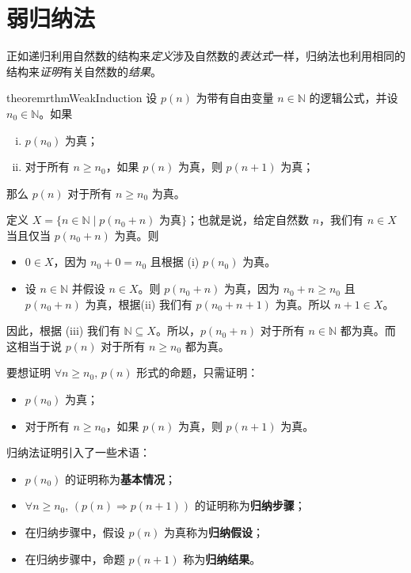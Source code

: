 \section{弱归纳法}

正如递归利用自然数的结构来\textit{定义}涉及自然数的\textit{表达式}一样，归纳法也利用相同的结构来\textit{证明}有关自然数的\textit{结果}。

\begin{restatable}[弱归纳原理]{theorem}{rthmWeakInduction}
\label{thmWeakInduction}
设 $p(n)$ 为带有自由变量 $n \in \mathbb{N}$ 的逻辑公式，并设 $n_0 \in \mathbb{N}$。如果
\begin{enumerate}[(i)] 
\item $p(n_0)$ 为真；
\item 对于所有 $n \ge n_0$，如果 $p(n)$ 为真，则 $p(n+1)$ 为真；
\end{enumerate}
那么 $p(n)$ 对于所有 $n \ge n_0$ 为真。
\end{restatable}

\begin{cproof}
定义 $X = \{ n \in \mathbb{N} \mid p(n_0 + n) \text{ 为真} \}$；也就是说，给定自然数 $n$，我们有 $n \in X$ 当且仅当 $p(n_0 + n)$ 为真。则
\begin{itemize}
\item $0 \in X$，因为 $n_0 + 0 = n_0$ 且根据 (i) $p(n_0)$ 为真。
\item 设 $n \in \mathbb{N}$ 并假设 $n \in X$。则 $p(n_0+n)$ 为真，因为 $n_0 + n \ge n_0$ 且 $p(n_0+n)$ 为真，根据(ii) 我们有 $p(n_0+n+1)$ 为真。所以 $n+1 \in X$。
\end{itemize}

因此，根据 (iii) 我们有 $\mathbb{N} \subseteq X$。所以，$p(n_0 + n)$ 对于所有 $n \in \mathbb{N}$ 都为真。而这相当于说 $p(n)$ 对于所有 $n \ge n_0$ 都为真。
\end{cproof}

\begin{strategy}[{(弱)} 归纳法证明]
要想证明 $\forall n \ge n_0,\, p(n)$ 形式的命题，只需证明：
\begin{itemize}
\item $p(n_0)$ 为真；
\item 对于所有 $n \ge n_0$，如果 $p(n)$ 为真，则 $p(n+1)$ 为真。
\end{itemize}
归纳法证明引入了一些术语：
\begin{itemize}
\item $p(n_0)$ 的证明称为\textbf{基本情况}；
\item $\forall n \ge n_0,\, (p(n) \Rightarrow p(n+1))$ 的证明称为\textbf{归纳步骤}；
\item 在归纳步骤中，假设 $p(n)$ 为真称为\textbf{归纳假设}；
\item 在归纳步骤中，命题 $p(n+1)$ 称为\textbf{归纳结果}。
\end{itemize}
\end{strategy}


